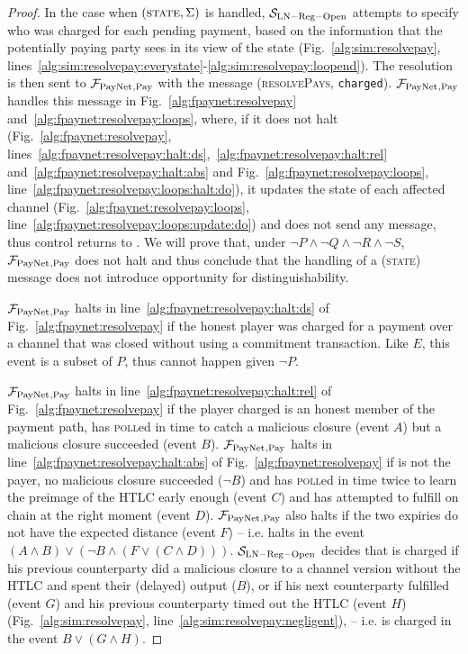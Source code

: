 \begin{proof}
  In the case when $\left(\textsc{state}, \Sigma\right)$ is handled,
  $\mathcal{S}_{\mathrm{LN - Reg - Open}}$ attempts to specify who was charged
  for each pending payment, based on the information that the potentially paying
  party sees in its view of the \ledger{} state (Fig.~\ref{alg:sim:resolvepay},
  lines~\ref{alg:sim:resolvepay:everystate}-\ref{alg:sim:resolvepay:loopend}).
  The resolution is then sent to $\mathcal{F}_{\mathrm{PayNet}}{}_{\mathrm{, Pay}}$ with the message
  (\textsc{resolvePays}, \texttt{charged}). $\mathcal{F}_{\mathrm{PayNet}}{}_{\mathrm{, Pay}}$
  handles this message in Fig.~\ref{alg:fpaynet:resolvepay}
  and~\ref{alg:fpaynet:resolvepay:loops}, where, if it does not halt
  (Fig.~\ref{alg:fpaynet:resolvepay},
  lines~\ref{alg:fpaynet:resolvepay:halt:ds},~\ref{alg:fpaynet:resolvepay:halt:rel}
  and~\ref{alg:fpaynet:resolvepay:halt:abs} and
  Fig.~\ref{alg:fpaynet:resolvepay:loops},
  line~\ref{alg:fpaynet:resolvepay:loops:halt:do}), it updates the state of each
  affected channel (Fig.~\ref{alg:fpaynet:resolvepay:loops},
  line~\ref{alg:fpaynet:resolvepay:loops:update:do}) and does not send any
  message, thus control returns to \environment. We will prove that, under $\neg
  P \wedge \neg Q \wedge \neg R \wedge \neg S$, $\mathcal{F}_{\mathrm{PayNet}}{}_{\mathrm{, Pay}}$
  does not halt and thus conclude that the handling of a (\textsc{state})
  message does not introduce opportunity for distinguishability.

  $\mathcal{F}_{\mathrm{PayNet}}{}_{\mathrm{, Pay}}$ halts in
  line~\ref{alg:fpaynet:resolvepay:halt:ds} of
  Fig.~\ref{alg:fpaynet:resolvepay} if the honest player \dave{} was charged for
  a payment over a channel that was closed without using a commitment
  transaction. Like $E$, this event is a subset of $P$, thus cannot happen given
  $\neg P$.

  $\mathcal{F}_{\mathrm{PayNet}}{}_{\mathrm{, Pay}}$ halts in
  line~\ref{alg:fpaynet:resolvepay:halt:rel} of
  Fig.~\ref{alg:fpaynet:resolvepay} if the player \dave{} charged is an honest
  member of the payment path, has \textsc{poll}ed in time to catch a malicious
  closure (event $A$) but a malicious closure succeeded (event $B$).
  $\mathcal{F}_{\mathrm{PayNet}}{}_{\mathrm{, Pay}}$ halts in
  line~\ref{alg:fpaynet:resolvepay:halt:abs} of
  Fig.~\ref{alg:fpaynet:resolvepay} if \dave{} is not the payer, no malicious
  closure succeeded ($\neg B$) and \dave{} has \textsc{poll}ed in time twice to
  learn the preimage of the HTLC early enough (event $C$) and has attempted to
  fulfill on chain at the right moment (event $D$). $\mathcal{F}_{\mathrm{PayNet}}{}_{\mathrm{,
  Pay}}$ also halts if the two expiries do not have the expected distance (event
  $F$) -- i.e. halts in the event $(A \wedge B) \vee (\neg B \wedge (F \vee (C
  \wedge D)))$. $\mathcal{S}_{\mathrm{LN - Reg - Open}}$ decides that \dave{} is
  charged if his previous counterparty did a malicious closure to a channel
  version without the HTLC and spent their (delayed) output ($B$), or if his
  next counterparty fulfilled (event $G$) and his previous counterparty timed
  out the HTLC (event $H$) (Fig.~\ref{alg:sim:resolvepay},
  line~\ref{alg:sim:resolvepay:negligent}), -- i.e. \dave{} is charged in the
  event $B \vee (G \wedge H)$.


\end{proof}
